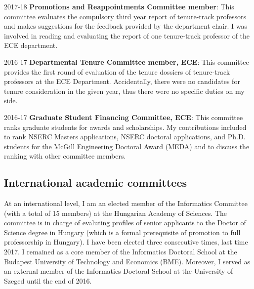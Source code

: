 \begin{yearlist}
\item[2017-18] \textbf{Promotions and Reappointments Committee member}: This committee evaluates the compulsory third year report of tenure-track professors and makes suggestions for the feedback provided by the department chair. I was involved in reading and evaluating the report of one tenure-track professor of the ECE department. 
\item[2016-17] \textbf{Departmental Tenure Committee member, ECE}: This committee provides the first round of evaluation of the tenure dossiers of tenure-track professors at the ECE Department. Accidentally, there were no candidates for tenure consideration in the given year, thus there were no specific duties on my side. 
\item[2016-17] \textbf{Graduate Student Financing Committee, ECE}: This committee ranks graduate students for awards and scholarships. My contributions included to rank NSERC Masters applications, NSERC doctoral applications, and Ph.D. students for the McGill Engineering Doctoral Award (MEDA) and to discuss the ranking with other committee members.
\end{yearlist}

\subsection{International academic committees}
At an international level, I am an elected member of the Informatics Committee (with a total of 15 members) at the Hungarian Academy of Sciences. The committee is in charge of evaluting profiles of senior applicants to the Doctor of Science degree in Hungary (which is a formal prerequisite of promotion to full professorship in Hungary). I have been elected three consecutive times, last time 2017. I remained as a core member of the Informatics Doctoral School at the Budapest University of Technology and Economics (BME). Moreover, I served as an external member of the Informatics Doctoral School at the University of Szeged until the end of 2016.


 
